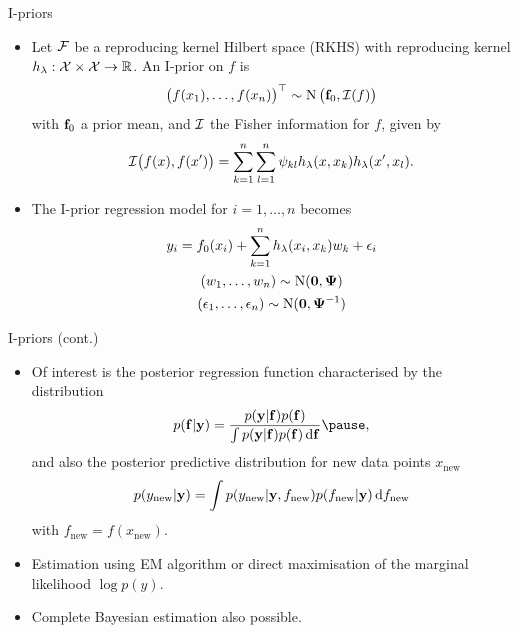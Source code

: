 \begin{frame}{I-priors}
  \vspace{-16pt}
  \begin{itemize}\setlength\itemsep{0.3em}
    \item Let ${\mathcal F}$ be a reproducing kernel Hilbert space (RKHS) with reproducing kernel $h_\lambda: {\mathcal X} \times {\mathcal X} \rightarrow \mathbb{R}$. An I-prior on $f$ is
    \[
      \big(f(x_1), \dots, f(x_n)\big)^\top \sim \operatorname{N}\big({\mathbf f}_0, {\mathcal I}(f)\big)
    \] 
    with ${\mathbf f}_0$ a prior mean, and ${\mathcal I}$ the Fisher information for $f$, given by
    \[
      {\mathcal I}\big(f(x), f(x')\big) = \sum_{k=1}^n\sum_{l=1}^n \psi_{kl} h_\lambda(x,x_k) h_\lambda(x',x_l).
    \]
    \pause
    \item The I-prior regression model for $i = 1,\dots,n$ becomes
    \begin{align*}
      \begin{gathered}
        y_i = f_0(x_i) + \sum_{k=1}^n h_\lambda(x_i, x_k)w_k + \epsilon_i \\
        (w_1, \dots, w_n) \sim \operatorname{N}({\mathbf 0}, {\bm\Psi}) \\
        (\epsilon_1, \dots, \epsilon_n) \sim \operatorname{N}({\mathbf 0}, {\bm\Psi}^{-1})
      \end{gathered}    
    \end{align*}
  \end{itemize}
  \vspace{2pt}
\end{frame}

\begin{frame}{I-priors (cont.)}
  \vspace{-5pt}
  \begin{itemize}\setlength\itemsep{0.8em}
    \item Of interest is the posterior regression function characterised by the distribution
    \[
      p(\bff | \by ) = \frac{p(\by | \bff) p(\bff)}{\int p(\by | \bff) p(\bff) \d\bff} \pause,
    \]
    and also the posterior predictive distribution for new data points $x_{\text{new}}$
    \[
      p(y_{\text{new}} | {\mathbf y}) = \int p(y_{\text{new}} | {\mathbf y}, f_{\text{new}}) p(f_{\text{new}} | {\mathbf y} ) \, \text{d} f_{\text{new}}
    \]
    with $f_{\text{new}} = f(x_{\text{new}})$.
    \pause
    \item Estimation using EM algorithm or direct maximisation of the marginal likelihood $\log p(y)$.
    \item Complete Bayesian estimation also possible.
  \end{itemize}
  \vspace{5pt}
\end{frame}

